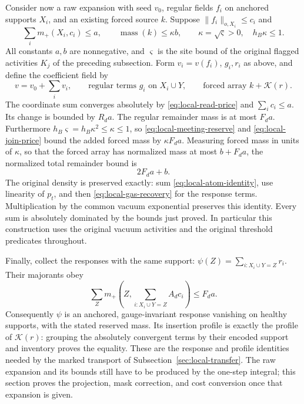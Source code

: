 Consider now a raw expansion with seed $v_0$, regular fields $f_i$
on anchored supports $X_i$, and an existing forced source $k$.
Suppose $\|f_i\|_{o,X_i}\le c_i$ and
\[
       \sum_i m_+(X_i,c_i)\le a,\qquad
                      \operatorname{mass}(k)\le\kappa b,
       \qquad \kappa=\sqrt\varsigma>0,\quad h_B\kappa\le1.
\]
All constants $a,b$ are nonnegative, and $\varsigma$ is the site bound
of the original flagged activities $K_j$ of the preceding subsection.
Form $v_i=v(f_i)$,
$g_i,r_i$ as above, and define the coefficient field by
\begin{equation}\label{eq:local-built-field}
       v=v_0+\sum_i v_i,\qquad
       \text{regular terms }g_i\text{ on }X_i\cup Y,\qquad
       \text{forced array }k+\mathcal K(r).
\end{equation}
The coordinate sum converges absolutely by
\eqref{eq:local-read-price} and $\sum_i c_i\le a$.
Its change is bounded by $R_da$. The regular remainder mass is at
most $F_da$. Furthermore $h_B\varsigma=h_B\kappa^2\le\kappa\le1$,
so \eqref{eq:local-meeting-reserve} and
\eqref{eq:local-join-price} bound the added forced mass by
$\kappa F_da$. Measuring forced mass in units of $\kappa$, so that
the forced array has normalized mass at most $b+F_da$, the normalized
total remainder bound is
\begin{equation}\label{eq:local-built-cost}
                              2F_da+b.
\end{equation}
The original density is preserved exactly: sum
\eqref{eq:local-atom-identity}, use linearity of $p_t$, and then
\eqref{eq:local-gas-recovery} for the response terms. Multiplication
by the common vacuum exponential preserves this identity.
Every sum is absolutely dominated by the bounds just proved.
In particular this construction uses the original vacuum activities
and the original threshold predicates throughout.

Finally, collect the responses with the same support:
$\psi(Z)=\sum_{i:X_i\cup Y=Z}r_i$. Their majorants obey
\[
       \sum_Z m_+\left(Z,\sum_{i:X_i\cup Y=Z}A_dc_i\right)
                                    \le F_da.
\]
Consequently $\psi$ is an anchored, gauge-invariant response vanishing
on healthy supports, with the stated reserved mass. Its insertion
profile is exactly the profile of $\mathcal K(r)$: grouping the
absolutely convergent terms by their encoded support and inventory
proves the equality. These are the response and profile identities
needed by the marked transport of Subsection~\ref{sec:local-transfer}.
The raw expansion and its bounds still have to be produced by the
one-step integral; this section proves the projection, mask correction,
and cost conversion once that expansion is given.
